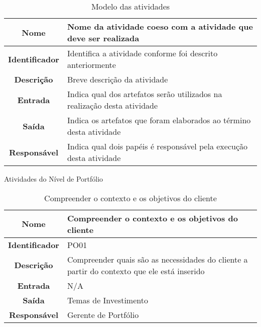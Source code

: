 {	\begin{table}[H]
                \centering
                \caption{Modelo das atividades}
                \begin{tabular}{c|p{10cm}}
                    \hline
                    \textbf{Nome}            & Nome da atividade coeso com a atividade que deve ser realizada\\
                    \hline
                    \textbf{Identificador} & Identifica a atividade conforme foi descrito anteriormente\\ 
                    \hline
                    \textbf{Descrição}   & Breve descrição da atividade\\ 
                    \hline
                    \textbf{Entrada}           & Indica qual dos artefatos serão utilizados na realização desta atividade\\
                    \hline
                    \textbf{Saída}            &  Indica os artefatos que foram elaborados ao término desta atividade\\
                    \hline
                    \textbf{Responsável}            & Indica qual dois papéis é responsável pela execução  desta atividade\\
                    \hline                    
                \end{tabular}
            \end{table}


    \large{Atividades do Nível de Portfólio}



          \begin{table}[H]
                \centering
                \caption{Compreender o contexto e os objetivos do cliente}
                \begin{tabular}{c|p{10cm}}
                    \hline
                    \textbf{Nome}            & Compreender o contexto e os objetivos do cliente\\
                    \hline
                    \textbf{Identificador} & PO01\\ 
                    \hline
                    \textbf{Descrição}   & Compreender quais são as necessidades do cliente  a partir do contexto que ele está inserido\\ 
                    \hline
                    \textbf{Entrada}           & N/A\\
                    \hline
                    \textbf{Saída}            &  Temas de Investimento\\
                    \hline
                    \textbf{Responsável}            & Gerente de Portfólio\\
                    \hline                    
                \end{tabular}
            \end{table}


}
